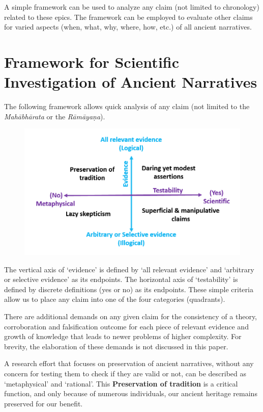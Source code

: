 A simple framework can be used to analyze any claim (not limited to chronology) related to these epics. The framework can be employed to evaluate other claims for varied aspects (when, what, why, where, how, etc.) of all ancient narratives.


\section*{Framework for Scientific Investigation of Ancient Narratives}

The following framework allows quick analysis of any claim (not limited to the \textit{Mahābhārata} or the \textit{Rāmāyaṇa}).
\begin{figure}[H]
\includegraphics[scale=.3]{images/chap2-2.jpg}\\[0.2cm]
\end{figure}

The vertical axis of ‘evidence’ is defined by ‘all relevant evidence’ and ‘arbitrary or selective evidence’ as its endpoints. The horizontal axis of ‘testability’ is defined by discrete definitions (yes or no) as its endpoints. These simple criteria allow us to place any claim into one of the four categories (quadrants).

There are additional demands on any given claim for the consistency of a theory, corroboration and falsification outcome for each piece of relevant evidence and growth of knowledge that leads to newer problems of higher complexity. For brevity, the elaboration of these demands is not discussed in this paper.


A research effort that focuses on preservation of ancient narratives, without any concern for testing them to check if they are valid or not, can be described as ‘metaphysical’ and ‘rational’. This \textbf{Preservation of tradition} is a critical function, and only because of numerous individuals, our ancient heritage remains preserved for our benefit.

